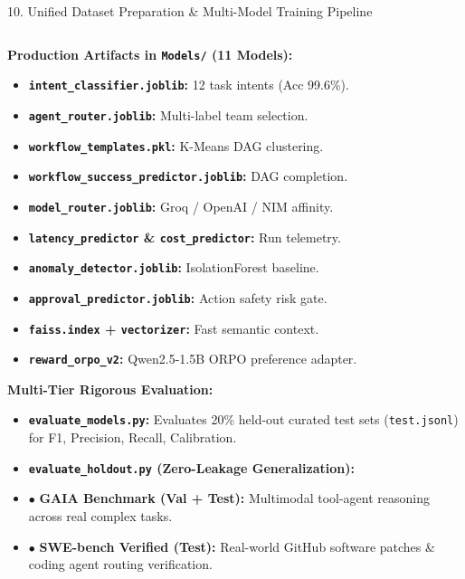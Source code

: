 \documentclass[aspectratio=169,10pt]{beamer}
\begin{document}
\begin{frame}[t]{10. Unified Dataset Preparation \& Multi-Model Training Pipeline}
\begin{columns}[T]
\begin{column}{0.35\textwidth}
  \begin{tcolorbox}[
    enhanced, arc=3pt, colframe=lavenderMedium, colback=white,
    title={\scriptsize\bfseries\faCheckCircle\ 3. Artifacts \& Holdout Evaluation},
    boxrule=0.55pt, left=2.8pt, right=2.8pt, top=1.8pt, bottom=1.8pt
  ]
  \fontsize{4.6}{5.5}\selectfont
  \textbf{Production Artifacts in \texttt{Models/} (11 Models):}
  \begin{itemize}\setlength{\itemsep}{0.7pt}
    \item \textbf{\texttt{intent\_classifier.joblib}:} 12 task intents (Acc 99.6\%).
    \item \textbf{\texttt{agent\_router.joblib}:} Multi-label team selection.
    \item \textbf{\texttt{workflow\_templates.pkl}:} K-Means DAG clustering.
    \item \textbf{\texttt{workflow\_success\_predictor.joblib}:} DAG completion.
    \item \textbf{\texttt{model\_router.joblib}:} Groq / OpenAI / NIM affinity.
    \item \textbf{\texttt{latency\_predictor} \& \texttt{cost\_predictor}:} Run telemetry.
    \item \textbf{\texttt{anomaly\_detector.joblib}:} IsolationForest baseline.
    \item \textbf{\texttt{approval\_predictor.joblib}:} Action safety risk gate.
    \item \textbf{\texttt{faiss.index} + \texttt{vectorizer}:} Fast semantic context.
    \item \textbf{\texttt{reward\_orpo\_v2}:} Qwen2.5-1.5B ORPO preference adapter.
  \end{itemize}
  \vspace{1.2pt}
  \textbf{Multi-Tier Rigorous Evaluation:}
  \begin{itemize}\setlength{\itemsep}{0.7pt}
    \item \textbf{\texttt{evaluate\_models.py}:} Evaluates 20\% held-out curated test sets (\texttt{test.jsonl}) for F1, Precision, Recall, Calibration.
    \item \textbf{\texttt{evaluate\_holdout.py} (Zero-Leakage Generalization):}
    \item $\bullet$ \textbf{GAIA Benchmark (Val + Test):} Multimodal tool-agent reasoning across real complex tasks.
    \item $\bullet$ \textbf{SWE-bench Verified (Test):} Real-world GitHub software patches \& coding agent routing verification.
  \end{itemize}
  \end{tcolorbox}
\end{column}


\end{columns}
\end{frame}
\end{document}

